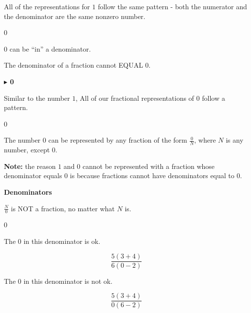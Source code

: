 \documentclass{ximera}
\begin{document}
All of the representations for $1$ follow the same pattern - both the numerator and the denominator are the same nonzero number. 


\begin{warning}  \textbf{\textcolor{red!70!black}{$0$}}

$0$ can be ``in'' a denominator.

The denominator of a fraction cannot EQUAL $0$.

\end{warning}




\textbf{\textcolor{purple!85!blue}{$\blacktriangleright$ 0}} 


Similar to the number $1$, All of our fractional representations of $0$ follow a pattern.






\begin{idea} \textbf{\textcolor{blue!55!black}{$0$}} 

The number $0$ can be represented by any fraction of the form $\frac{0}{N}$, where $N$ is any number, except $0$.


\end{idea}

\textbf{Note:} the reason $1$ and $0$ cannot be represented with a fraction whose denominator equals $0$ is because fractions cannot have denominators equal to $0$.






\begin{warning} \textbf{\textcolor{red!70!black}{Denominators}}


$\frac{N}{0}$ is NOT a fraction, no matter what $N$ is.



\end{warning}






\begin{example} $0$

The $0$ in this denominator is ok.

\[
\frac{5(3 + 4)}{6(0 - 2)}
\]


The $0$ in this denominator is not ok.

\[
\frac{5(3 + 4)}{0(6 - 2)}
\]


\end{example}
\end{document}
